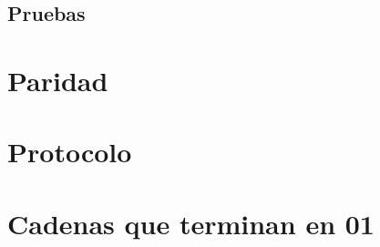 \documentclass[12pt]{article}
\begin{document}
\begin{lstlisting}[frame=single]
\end{lstlisting}

\subsection{Pruebas}

\newpage
\section{Paridad}

\newpage
\section{Protocolo}

\newpage
\section{Cadenas que terminan en 01}




\end{document}
